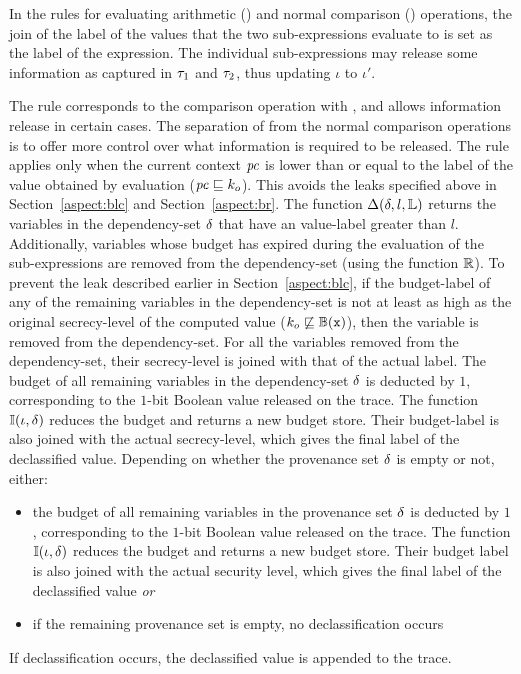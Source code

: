 In the rules for evaluating arithmetic ()
and normal comparison () operations, 
the join of the label of the values that the two sub-expressions 
evaluate to is set as the label of the expression. The individual 
sub-expressions may release some information as captured in 
$\tau_1$ and $\tau_2$, thus updating $\iota$ to $\iota'$.

The  rule corresponds to the comparison operation
with \dec, and allows information release in certain cases. The
separation of  from the normal comparison operations is
to offer more control over what information is required to be
released. The rule applies only when the current context $\mathit{pc}$ is
lower than or equal to the label of the value obtained by evaluation
($\mathit{pc} \sqsubseteq k_o$). This avoids the leaks specified above
in Section~\ref{aspect:blc} and Section~\ref{aspect:br}. The function
$\Delta(\delta, l, \mathbb{L})$ returns the variables in the dependency-set
$\delta$ that have an value-label greater than $l$. Additionally, variables
whose budget has expired during the evaluation of the sub-expressions
are removed from the dependency-set (using the function $\mathbb{R}$). 
To prevent the leak described earlier in Section~\ref{aspect:blc}, if the budget-label of any of
the remaining variables in the dependency-set is not at least as high
as the original secrecy-level of the computed value
($k_o \not\sqsubseteq \mathbb{B}(\texttt{x})$), then the variable is removed
from the dependency-set. For all the variables removed from the
dependency-set, their secrecy-level is joined with that of the actual
label. The budget of all remaining
variables in the dependency-set $\delta$ is deducted by $1$,
corresponding to the $1$-bit Boolean value released on the trace. The
function $\mathbb{I}(\iota, \delta)$ reduces the budget and returns a
new budget store. Their budget-label is also joined with the actual
secrecy-level, which gives the final label of the declassified value.
  Depending on whether the provenance set $\delta$ is empty or not,
  either:  
  \begin{itemize}
  \item the budget of all remaining variables in the provenance set
    $\delta$ is deducted by $1$, corresponding to the $1$-bit Boolean
    value released on the trace. The function $\mathbb{I}(\iota,
    \delta)$ reduces the budget and returns a new budget store. Their
    budget label is also joined  with the actual security level, which
    gives the final label of the declassified value \emph{or}
  \item if the remaining provenance set is empty, no declassification
    occurs
  \end{itemize}
  If declassification occurs, the declassified value is appended to
  the trace.
  
